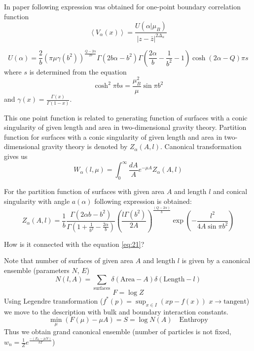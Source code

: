\documentclass[12pt]{article}
\begin{document}
In paper \cite{fateev2000boundary} following expression was obtained for one-point boundary
correlation function
\begin{equation}
  \label{eq:22}
  \left<V_{\alpha}(x)\right>=\frac{U(\alpha|\mu_{B})}{|z-\bar z|^{2\Delta_{\alpha}}}
\end{equation}

\begin{equation}
  \label{eq:21}
  U(\alpha)=\frac{2}{b}\left(\pi\mu\gamma( b^{2})\right)^{\frac{Q-2\alpha}{2b}} \Gamma(2b\alpha-b^{2})
  \Gamma\left(\frac{2\alpha}{b}-\frac{1}{b^{2}}-1\right) \cosh (2\alpha-Q)\pi s
\end{equation}
where $s$ is determined from the equation
\begin{equation}
  \label{eq:23}
  \cosh^{2} \pi b s=\frac{\mu_{B}^{2}}{\mu}\sin \pi b^{2}
\end{equation}
and $\gamma(x)=\frac{\Gamma(x)}{\Gamma(1-x)}$.


This one point function is related to generating function of surfaces with a conic singularity of given length and area in
two-dimensional gravity theory. 
Partition function for  surfaces with a conic singularity of given length and area in
two-dimensional gravity theory is denoted by $Z_{\alpha}(A,l)$. Canonical transformation gives us
\begin{equation}
  \label{eq:24}
  W_{\alpha}(l,\mu)=\int_{0}^{\infty} \frac{dA}{A} e^{-\mu A}Z_{\alpha}(A,l)
\end{equation}

For the partition function of surfaces with given area $A$ and length $l$ and conical singularity
with angle $a(\alpha)$ following expression is obtained:
\begin{equation}
  \label{eq:29}
  Z_{\alpha}(A,l)=\frac{1}{b}\frac{\Gamma(2\alpha b
    -b^{2})}{\Gamma\left(1+\frac{1}{b^{2}}-\frac{2\alpha}{b}\right)} \left(\frac{l\Gamma(b^{2})}{2
      A}\right)^{\frac{(Q-2\alpha)}{b}} \exp\left(-\frac{l^{2}}{4 A \sin \pi b^{2}}\right)
\end{equation}

How is it connected with the equation \eqref{eq:21}?

Note that number of surfaces of given area $A$ and length $l$ is given by a canonical ensemble
(parameters $N$, $E$)
\begin{equation}
  \label{eq:25}
  N(l,A) = \sum_{\mbox{surfaces}} \delta(\mbox{Area}-A)\delta(\mbox{Length}-l)
\end{equation}
\begin{equation}
  \label{eq:26}
  F=\log Z
\end{equation}
Using Legendre transformation ($f^{*}(p)=\sup_{x\in I} (xp - f(x))$ $x\to \mbox{tangent}$) we move
to the description with bulk and boundary interaction constants. 
\begin{equation}
  \label{eq:27}
  \min_{\mu}(F(\mu)-\mu A) = S = \log N(A) \quad \mbox{Enthropy}
\end{equation}
Thus we obtain grand canonical ensemble (number of particles is not fixed, $w_{n}=\frac{1}{Z}
e^{\frac{-(E_{n}-\mu N)}{kT}}$)
\end{document}
